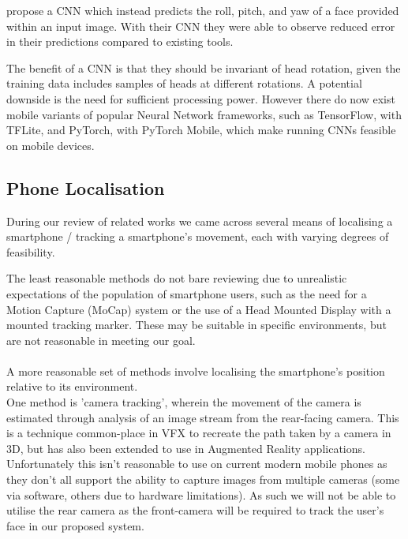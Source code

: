 \citeauthor{yan2021fast} propose a CNN which instead predicts the roll, pitch, and yaw of a face provided within an input image\cite{yan2021fast}. With their CNN they were able to observe reduced error in their predictions compared to existing tools.

The benefit of a CNN is that they should be invariant of head rotation, given the training data includes samples of heads at different rotations.
A potential downside is the need for sufficient processing power. However there do now exist mobile variants of popular Neural Network frameworks, such as TensorFlow, with TFLite, and PyTorch, with PyTorch Mobile, which make running CNNs feasible on mobile devices.



\subsection{Phone Localisation}
During our review of related works we came across several means of localising a smartphone / tracking a smartphone's movement, each with varying degrees of feasibility.

The least reasonable methods do not bare reviewing due to unrealistic expectations of the population of smartphone users, such as the need for a Motion Capture (MoCap) system\cite{buschel2017investigating} or the use of a Head Mounted Display with a mounted tracking marker\cite{mohr2019trackcap}.
These may be suitable in specific environments, but are not reasonable in meeting our goal.
\\\\
A more reasonable set of methods involve localising the smartphone's position relative to its environment.
\\
One method is 'camera tracking', wherein the movement of the camera is estimated through analysis of an image stream from the rear-facing camera. This is a technique common-place in VFX to recreate the path taken by a camera in 3D\cite{barber2016camera}, but has also been extended to use in Augmented Reality applications\cite{jiang2000camera}.
Unfortunately this isn't reasonable to use on current modern mobile phones as they don't all support the ability to capture images from multiple cameras (some via software, others due to hardware limitations). As such we will not be able to utilise the rear camera as the front-camera will be required to track the user's face in our proposed system.

